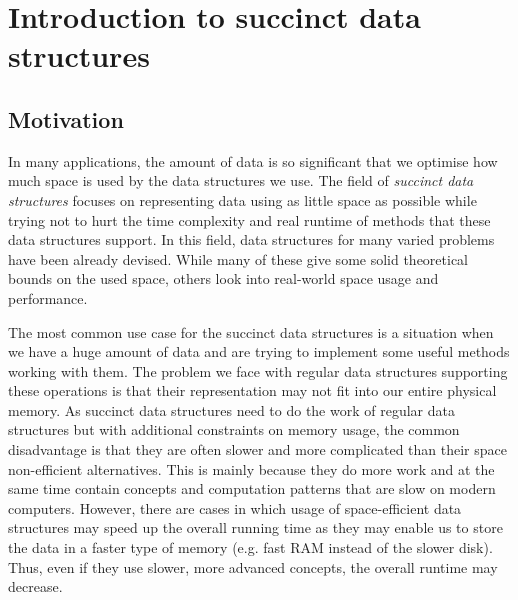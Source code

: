 \chapter{Introduction to succinct data structures}
\label{kap:kap1}

\section{Motivation}

In many applications, the amount of data is so significant that we optimise how much
space is used by the data structures we use. The field of \textit{succinct data structures}
focuses on representing data using as little space as possible while trying not to hurt
the time complexity and real runtime of methods that these data structures support. In
this field, data structures for many varied problems have been already devised. While
many of these give some solid theoretical bounds on the used space, others look into
real-world space usage and performance.

The most common use case for the succinct data structures is a situation when we
have a huge amount of data and are trying to implement some useful methods working
with them. The problem we face with regular data structures supporting these
operations is that their representation may not fit into our entire physical
memory. As succinct data structures need to do the work of regular data structures but
with additional constraints on memory usage, the common disadvantage is that
they are often slower and more complicated than their space non-efficient
alternatives. This is mainly because they do more work and at the same time contain
concepts and computation patterns that are slow on modern computers. However, there
are cases in which usage of space-efficient data structures may speed up the overall
running time as they may enable us to store the data in a faster type of memory
(e.g. fast RAM instead of the slower disk). Thus, even if they use slower, more
advanced concepts, the overall runtime may decrease.


